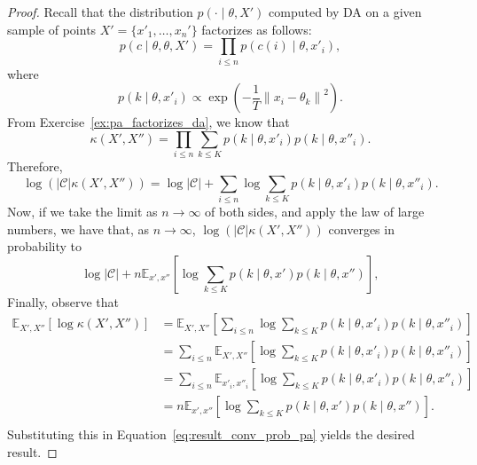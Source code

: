\begin{proof}
Recall that the distribution $p(\cdot \mid \theta, X')$ computed by DA on a given sample of points $X' = \{x'_1, \ldots, x_n'\}$ factorizes as follows:
%
\begin{equation}
p(c \mid \theta, \theta, X') = \prod_{i \leq n} p(c(i) \mid \theta, x'_i),
\end{equation}
%
where
%
\begin{equation}
p(k \mid \theta, x'_i) \propto \exp\left(-\frac{1}{T}\left\|x_i - \theta_k\right\|^2\right).
\end{equation}
%
From Exercise~\ref{ex:pa_factorizes_da}, we know that
%
\begin{equation}
\kappa\left(X', X''\right) = \prod_{i \leq n} \sum_{k \leq K} p(k \mid \theta, x'_i)p(k \mid \theta, x''_i).
\end{equation}
%
Therefore,
%
\begin{equation}
\log \left(\left|\mathcal{C}\right|\kappa\left(X', X''\right)\right) = \log \left|\mathcal{C}\right| + \sum_{i \leq n}\log \sum_{k \leq K} p(k \mid \theta, x'_i)p(k \mid \theta, x''_i).
\end{equation}
%
Now, if we take the limit as $n \to \infty$ of both sides, and apply the law of large numbers, we have that, as $n \to \infty$, $\log \left(\left|\mathcal{C}\right|\kappa\left(X', X''\right)\right)$ converges in probability to
%
\begin{equation}
\log \left|\mathcal{C}\right| + n \mathbb{E}_{x', x''}\left[\log \sum_{k \leq K} p(k \mid \theta, x')p(k \mid \theta, x'')\right],
\label{eq:result_conv_prob_pa}
\end{equation}
%
Finally, observe that
%
\begin{align}
\mathbb{E}_{X', X''}\left[\log \kappa\left(X', X''\right)\right]
&= \mathbb{E}_{X', X''}\left[\sum_{i \leq n}\log \sum_{k \leq K} p(k \mid \theta, x'_i)p(k \mid \theta, x''_i)\right]\\
&= \sum_{i \leq n}\mathbb{E}_{X', X''}\left[\log \sum_{k \leq K} p(k \mid \theta, x'_i)p(k \mid \theta, x''_i)\right]\\
&= \sum_{i \leq n}\mathbb{E}_{x'_i, x''_i}\left[\log \sum_{k \leq K} p(k \mid \theta, x'_i)p(k \mid \theta, x''_i)\right]\\
&= n\mathbb{E}_{x', x''}\left[\log \sum_{k \leq K} p(k \mid \theta, x')p(k \mid \theta, x'')\right].\\
\end{align}
%
Substituting this in Equation~\ref{eq:result_conv_prob_pa} yields the desired result.
\end{proof}

